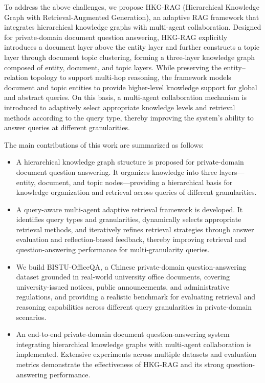 \documentclass[preprint,12pt,authoryear]{elsarticle}
\begin{document}
To address the above challenges, we propose HKG-RAG
(Hierarchical Knowledge Graph with Retrieval-Augmented Generation), an adaptive RAG framework that integrates hierarchical knowledge graphs with multi-agent collaboration. Designed for private-domain document question answering, HKG-RAG explicitly introduces a document layer above the entity layer and further constructs a topic layer through document topic clustering, forming a three-layer knowledge graph composed of entity, document, and topic layers. While preserving the entity--relation topology to support multi-hop reasoning, the framework models document and topic entities to provide higher-level knowledge support for global and abstract queries. On this basis, a multi-agent collaboration mechanism is introduced to adaptively select appropriate knowledge levels and retrieval methods according to the query type, thereby improving the system's ability to answer queries at different granularities.

The main contributions of this work are summarized as follows:

\begin{itemize}
\item A hierarchical knowledge graph structure is proposed for private-domain document question answering. It organizes knowledge into three layers---entity, document, and topic nodes---providing a hierarchical basis for knowledge organization and retrieval across queries of different granularities.
\item A query-aware multi-agent adaptive retrieval framework is developed. It identifies query types and granularities, dynamically selects appropriate retrieval methods, and iteratively refines retrieval strategies through answer evaluation and reflection-based feedback, thereby improving retrieval and question-answering performance for multi-granularity queries.
\item We build BISTU-OfficeQA, a Chinese private-domain question-answering dataset grounded in real-world university office documents, covering university-issued notices, public announcements, and administrative regulations, and providing a realistic benchmark for evaluating retrieval and reasoning capabilities across different query granularities in private-domain scenarios.
\item An end-to-end private-domain document question-answering system integrating hierarchical knowledge graphs with multi-agent collaboration is implemented. Extensive experiments across multiple datasets and evaluation metrics demonstrate the effectiveness of HKG-RAG and its strong question-answering performance.

\end{itemize}
\end{document}
